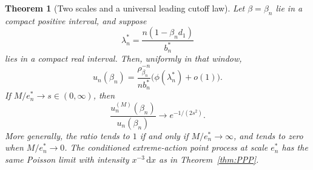 \documentclass[11pt,a4paper]{article}
\numberwithin{equation}{section}
\newtheorem{theorem}{Theorem}[section]
\theoremstyle{definition}
\theoremstyle{remark}
\newcommand{\dd}{\,\mathrm d}
\newcommand{\ph}{\phi}
\begin{document}
\begin{theorem}[Two scales and a universal leading cutoff law]
\label{thm:weightedbudget}
Let $\beta=\beta_n$ lie in a compact positive interval, and suppose
\[
 \lambda_n^*=\frac{n(1-\beta_n d_1)}{b_n^*}
\]
lies in a compact real interval. Then, uniformly in that window,
\begin{equation}\label{eq:weightedLLT}
 u_n(\beta_n)=\frac{\rho_{\beta_n}^{-n}}{n b_n^*}
                      \bigl(\ph(\lambda_n^*)+o(1)\bigr).
\end{equation}
If $M/e_n^*\to s\in(0,\infty)$, then
\begin{equation}\label{eq:weightedcutoff}
 \frac{u_n^{(M)}(\beta_n)}{u_n(\beta_n)}
       \longrightarrow e^{-1/(2s^2)}.
\end{equation}
More generally, the ratio tends to $1$ if and only if $M/e_n^*\to\infty$,
and tends to zero when $M/e_n^*\to0$. The conditioned extreme-action
point process at scale $e_n^*$ has the same Poisson limit with intensity
$x^{-3}\dd x$ as in Theorem~\ref{thm:PPP}.
\end{theorem}
\end{document}
